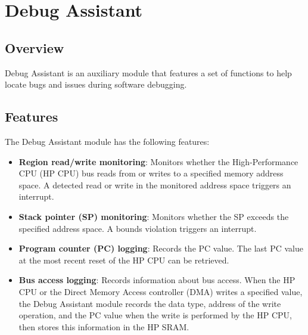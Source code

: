 \documentclass[main\_\_EN.tex]{subfiles}
\begin{document}

\ifglobal
\else
    \listoftodos
    {\let\clearpage\relax \listofdonetodos}
    \tableofcontents
\fi



\chapter{Debug Assistant}
\label{mod:dbgassist}
\hypertarget{dbgassist}{}

\section{Overview}

Debug Assistant is an auxiliary module that features a set of functions to help locate bugs and issues during software debugging.

\section{Features}
\label{sec:dbgassist-features}

The Debug Assistant module has the following features:

\begin{itemize}
    \item \textbf{Region read/write monitoring}: Monitors whether the High-Performance CPU (HP CPU) bus reads from or writes to a specified memory address space. A detected read or write in the monitored address space triggers an interrupt.
    \item \textbf{Stack pointer (SP) monitoring}: Monitors whether the SP exceeds the specified address space. A bounds violation triggers an interrupt.
    \item \textbf{Program counter (PC) logging}: Records the PC value. The last PC value at the most recent reset of the HP CPU can be retrieved.
    \item \textbf{Bus access logging}: Records information about bus access. When the HP CPU or the Direct Memory Access controller (DMA) writes a specified value, the Debug Assistant module records the data type, address of the write operation, and the PC value when the write is performed by the HP CPU, then stores this information in the HP SRAM.
\end{itemize}
\end{document}
